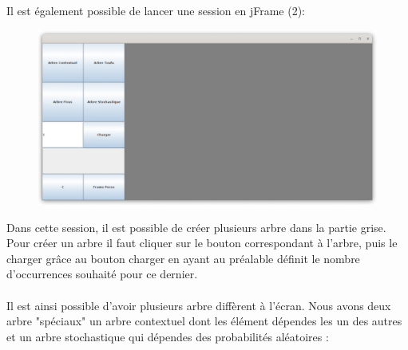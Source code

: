 \documentclass[a4paper,12pt]{article}
\begin{document}
\newpage
Il est également possible de lancer une session en jFrame (2): 
\begin{figure}[h]
\centering
\includegraphics[scale=0.48]{Gameplay/2D_start.png}
\end{figure}

Dans cette session, il est possible de créer plusieurs arbre dans la partie grise. Pour créer un arbre il faut cliquer sur le bouton correspondant à l'arbre, puis le charger grâce au bouton charger en ayant au préalable définit le nombre d'occurrences souhaité pour ce dernier. 
\\\\
Il est ainsi possible d'avoir plusieurs arbre diffèrent à l'écran. Nous avons deux arbre "spéciaux" un arbre contextuel dont les élément dépendes les un des autres et un arbre stochastique qui dépendes des probabilités aléatoires :
\end{document}
